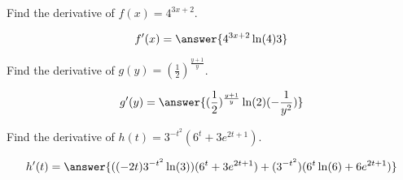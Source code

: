 \documentclass{ximera}
\author{Bobby Ramsey}
\begin{document}
\begin{exercise}
	Find the derivative of $\displaystyle f(x) = 4^{3x+2}$.
	
	\[ f'(x) = \answer{4^{3x+2}\ln(4)3} \]
\end{exercise}

\begin{exercise}
	Find the derivative of $\displaystyle g(y) = \left(\frac{1}{2}\right)^{\frac{y+1}{y} }$.

	\[ g'(y) = \answer{ (\frac{1}{2})^{\frac{y+1}{y}} \ln(2) ( -\frac{1}{y^2} ) }\]
\end{exercise}

\begin{exercise}
	Find the derivative of $\displaystyle h(t) = 3^{-t^2}\left(6^t+3e^{2t+1}\right)$.
	
	\[ h'(t) = \answer{ ((-2t)3^{-t^2}\ln(3))(6^t+3e^{2t+1})+(3^{-t^2})(6^t \ln(6) + 6e^{2t+1}) } \]
\end{exercise}
\end{document}
